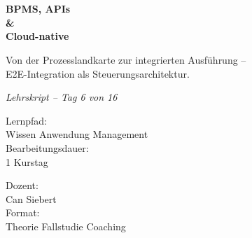 \documentclass[11pt,a4paper,oneside]{article}
\newcommand{\caveatfontfallback}{\itshape}
\newcommand\caveatfont{\caveatfontfallback}%
\begin{document}
\begin{titlepage}
  \pagestyle{empty}
  \vspace*{1.5cm}
  \\[2pt]
  \noindent{\color{lpAccent}\rule{\linewidth}{1.2pt}}\\[4pt]

  \vspace{3cm}
  {\sffamily\fontsize{30}{34}\selectfont\bfseries\color{lpInk}BPMS, APIs\\\&\\Cloud-native\par}

  \vspace{0.7cm}
  {\sffamily\large\color{lpGray}Von der Prozesslandkarte zur integrierten Ausführung --\\E2E-Integration als Steuerungsarchitektur.\par}

  \vspace{1.5cm}
  {\caveatfont\LARGE\color{lpAmber}Lehrskript -- Tag 6 von 16}\par

  \vfill

  \noindent\begin{minipage}{0.55\linewidth}
    {\sffamily\footnotesize\color{lpGray}Lernpfad:}\\
    {\sffamily\small\color{lpInk}Wissen \textrightarrow{} Anwendung \textrightarrow{} Management}\\[10pt]
    {\sffamily\footnotesize\color{lpGray}Bearbeitungsdauer:}\\
    {\sffamily\small\color{lpInk}1 Kurstag}
  \end{minipage}\hfill
  \begin{minipage}{0.4\linewidth}
    \raggedleft
    {\sffamily\footnotesize\color{lpGray}Dozent:}\\
    {\sffamily\small\color{lpInk}Can Siebert}\\[10pt]
    {\sffamily\footnotesize\color{lpGray}Format:}\\
    {\sffamily\small\color{lpInk}Theorie \textperiodcentered{} Fallstudie \textperiodcentered{} Coaching}
  \end{minipage}

  \vspace{0.5cm}
  \noindent{\color{lpAccent}\rule{\linewidth}{0.6pt}}
\end{titlepage}
\end{document}

